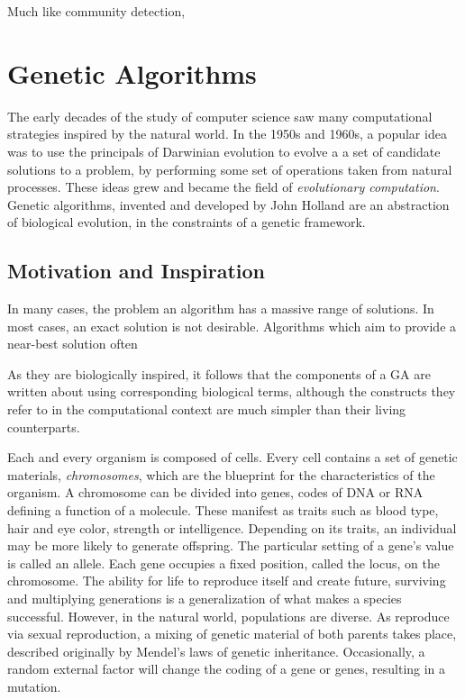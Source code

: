Much like community detection, 




\section{Genetic Algorithms}
The early decades of the study of computer science saw many computational strategies inspired by the natural world. In the 1950s and 1960s, a popular idea was to use the principals of Darwinian evolution to evolve a a set of candidate solutions to a problem, by performing some set of operations taken from natural processes. These ideas grew and became the field of \textit{evolutionary computation}. Genetic algorithms, invented and developed by John Holland \cite{holland1975adaptation} are an abstraction of biological evolution, in the constraints of a genetic framework. 

\cite{Ding2007}

\subsection{Motivation and Inspiration}
In many cases, the problem an algorithm has a massive range of solutions. In most cases, an exact solution is not desirable. Algorithms which aim to provide a near-best solution often 

As they are biologically inspired, it follows that the components of a GA are written about using corresponding biological terms, although the constructs they refer to in the computational context are much simpler than their living counterparts.

Each and every organism is composed of cells. Every cell contains a set of genetic materials, \textit{chromosomes}, which are the blueprint for the characteristics of the organism. A chromosome can be divided into genes, codes of DNA or RNA defining a function of a molecule. These manifest as traits such as blood type, hair and eye color, strength or intelligence. Depending on its traits, an individual may be more likely to generate offspring. The particular setting of a gene's value is called an allele. Each gene occupies a fixed position, called the locus, on the chromosome. The ability for life to reproduce itself and create future, surviving and multiplying generations is a generalization of what makes a species successful. However, in the natural world, populations are diverse. As reproduce via sexual reproduction, a mixing of genetic material of both parents takes place, described originally by Mendel's laws of genetic inheritance. Occasionally, a random external factor will change the coding of a gene or genes, resulting in a mutation.

